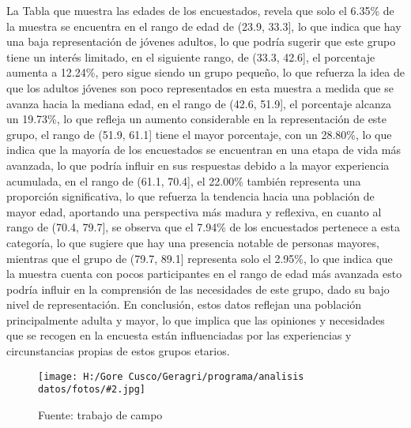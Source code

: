 \documentclass{article}\usepackage[]{graphicx}\usepackage[table]{xcolor}
\newenvironment{fotos}[2]
{\begin{figure}[H]
	\centering
	\caption{#1}
	\texttt{[image: H:/Gore Cusco/Geragri/programa/analisis datos/fotos/\#2.jpg]}
	\caption*{Fuente: trabajo de campo}}
{\end{figure}}
\begin{document}
La Tabla que muestra las edades de los encuestados, revela que solo el 6.35\% de la muestra se encuentra en el rango de edad de (23.9, 33.3], lo que indica que hay una baja representación de jóvenes adultos, lo que podría sugerir que este grupo tiene un interés limitado, en el siguiente rango, de (33.3, 42.6], el porcentaje aumenta a 12.24\%, pero sigue siendo un grupo pequeño, lo que refuerza la idea de que los adultos jóvenes son poco representados en esta muestra a medida que se avanza hacia la mediana edad, en el rango de (42.6, 51.9], el porcentaje alcanza un 19.73\%, lo que refleja un aumento considerable en la representación de este grupo, el rango de (51.9, 61.1] tiene el mayor porcentaje, con un 28.80\%, lo que indica que la mayoría de los encuestados se encuentran en una etapa de vida más avanzada, lo que podría influir en sus respuestas debido a la mayor experiencia acumulada, en el rango de (61.1, 70.4], el 22.00\% también representa una proporción significativa, lo que refuerza la tendencia hacia una población de mayor edad, aportando una perspectiva más madura y reflexiva, en cuanto al rango de (70.4, 79.7], se observa que el 7.94\% de los encuestados pertenece a esta categoría, lo que sugiere que hay una presencia notable de personas mayores, mientras que el grupo de (79.7, 89.1] representa solo el 2.95\%, lo que indica que la muestra cuenta con pocos participantes en el rango de edad más avanzada esto podría influir en la comprensión de las necesidades de este grupo, dado su bajo nivel de representación. En conclusión, estos datos reflejan una población principalmente adulta y mayor, lo que implica que las opiniones y necesidades que se recogen en la encuesta están influenciadas por las experiencias y circunstancias propias de estos grupos etarios.

\begin{fotos}
{Aplicacion de encuestas}{1}
\end{fotos}
\end{document}
